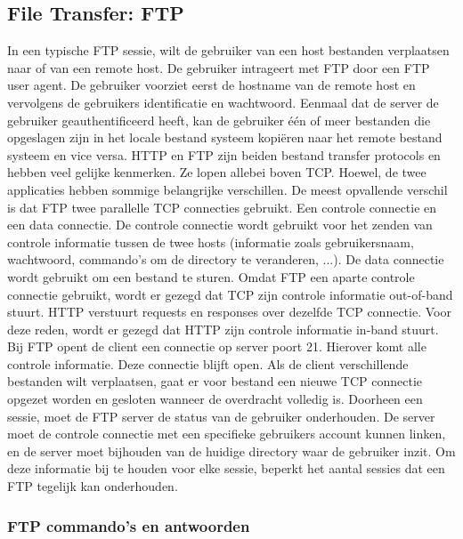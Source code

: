 \subsection{File Transfer: FTP}

In een typische FTP sessie, wilt de gebruiker van een host bestanden verplaatsen naar of van een remote host. De gebruiker intrageert met FTP door een FTP user agent. De gebruiker voorziet eerst de hostname van de remote host en vervolgens de gebruikers identificatie en wachtwoord. Eenmaal dat de server de gebruiker geauthentificeerd heeft, kan de gebruiker één of meer bestanden die opgeslagen zijn in het locale bestand systeem kopiëren naar het remote bestand systeem en vice versa.
HTTP en FTP zijn beiden bestand transfer protocols en hebben veel gelijke kenmerken. Ze lopen allebei boven TCP. Hoewel, de twee applicaties hebben sommige belangrijke verschillen. De meest opvallende verschil is dat FTP twee parallelle TCP connecties gebruikt. Een controle connectie en een data connectie. De controle connectie wordt gebruikt voor het zenden van controle informatie tussen de twee hosts (informatie zoals gebruikersnaam, wachtwoord, commando’s om de directory te veranderen, ...). De data connectie wordt gebruikt om een bestand te sturen. Omdat FTP een aparte controle connectie gebruikt, wordt er gezegd dat TCP zijn controle informatie out-of-band stuurt. HTTP verstuurt requests en responses over dezelfde TCP connectie. Voor deze reden, wordt er gezegd dat HTTP zijn controle informatie in-band stuurt.
Bij FTP opent de client een connectie op server poort 21. Hierover komt alle controle informatie. Deze connectie blijft open. Als de client verschillende bestanden wilt verplaatsen, gaat er voor bestand een nieuwe TCP connectie opgezet worden en gesloten wanneer de overdracht volledig is.
Doorheen een sessie, moet de FTP server de status van de gebruiker onderhouden. De server moet de controle connectie met een specifieke gebruikers account kunnen linken, en de server moet bijhouden van de huidige directory waar de gebruiker inzit. Om deze informatie bij te houden voor elke sessie, beperkt het aantal sessies dat een FTP tegelijk kan onderhouden.

\subsubsection{FTP commando’s en antwoorden}

